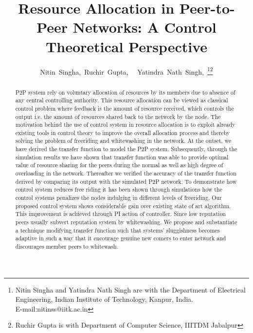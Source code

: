 \documentclass[journal]{IEEEtran}
\begin{document}
\title{Resource Allocation in Peer-to-Peer Networks: A Control Theoretical Perspective}


\author{Nitin~Singha,~Ruchir~Gupta,~
        ~Yatindra~Nath~Singh,~\thanks{Nitin Singha and Yatindra Nath Singh are with the Department of Electrical Engineering,
	Indian Institute of Technology, Kanpur, India.\protect\\
E-mail:{{nitinss}@iitk.ac.in}}\thanks{Ruchir Gupta is with Department of Computer Science,
IIITDM Jabalpur }}


\maketitle


\begin{abstract}
P2P system rely on voluntary allocation of resources by its members due to absence of any central controlling authority. This resource allocation can be viewed as classical control problem where feedback is the amount of resource received, which controls the output i.e. the amount of resources shared back to the network by the node. The motivation behind the use of control system in resource allocation is to exploit already existing tools in control theory to improve the overall allocation process and thereby solving the problem of freeriding and whitewashing in the network. At the outset, we have derived the transfer function to model the P2P system. Subsequently, through the simulation results we have shown that transfer function was able to provide optimal value of resource sharing for the peers during the normal as well as high degree of overloading in the network. Thereafter we verified the accuracy of the transfer function derived by comparing its output with the simulated P2P network. To demonstrate how control system reduces free riding it has been shown through simulations how the control systems penalizes the nodes indulging in different levels of freeriding. Our proposed control system shows considerable gain over existing state of art algorithm. This improvement is achieved through PI action of controller. Since low reputation peers usually subvert reputation system by whitewashing. We propose and substantiate a technique modifying transfer function such that systems' sluggishness becomes adaptive in such a way that it encourage genuine new comers to enter network and discourages member peers to whitewash.
\end{abstract}
\end{document}
